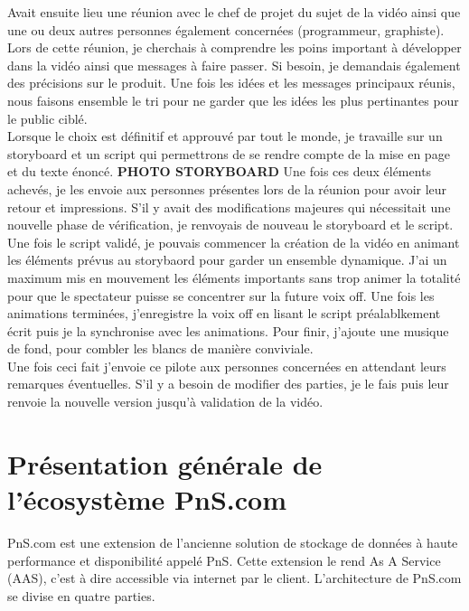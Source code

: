 Avait ensuite lieu une réunion avec le chef de projet du sujet de la vidéo ainsi que une ou deux autres personnes également concernées (programmeur, graphiste). Lors de cette réunion, je cherchais à comprendre les poins important à développer dans la vidéo ainsi que messages à faire passer. Si besoin, je demandais également des précisions sur le produit. Une fois les idées et les messages principaux réunis, nous faisons ensemble le tri pour ne garder que les idées les plus pertinantes pour le public ciblé.\\

Lorsque le choix est définitif et approuvé par tout le monde, je travaille sur un storyboard et un script qui permettrons de se rendre compte de la mise en page et du texte énoncé. \textbf{PHOTO STORYBOARD} Une fois ces deux éléments achevés, je les envoie aux personnes présentes lors de la réunion pour avoir leur retour et impressions. S'il y avait des modifications majeures qui nécessitait une nouvelle phase de vérification, je renvoyais de nouveau le storyboard et le script.\\


Une fois le script validé, je pouvais commencer la création de la vidéo en animant les éléments prévus au storybaord pour garder un ensemble dynamique. J'ai un maximum mis en mouvement les éléments importants sans trop animer la totalité pour que le spectateur puisse se concentrer sur la future voix off. Une fois les animations terminées, j'enregistre la voix off en lisant le script préalablkement écrit puis je la synchronise avec les animations. Pour finir, j'ajoute une musique de fond, pour combler les blancs de manière conviviale.\\

Une fois ceci fait j'envoie ce pilote aux personnes concernées en attendant leurs remarques éventuelles. S'il y a besoin de modifier des parties, je le fais puis leur renvoie la nouvelle version jusqu'à validation de la vidéo.



\section{Présentation générale de l'écosystème PnS.com}


PnS.com est une extension de l'ancienne solution de stockage de données à haute performance et disponibilité appelé PnS. Cette extension le rend As A Service (AAS), c'est à dire accessible via internet par le client. L'architecture de PnS.com se divise en quatre parties.

